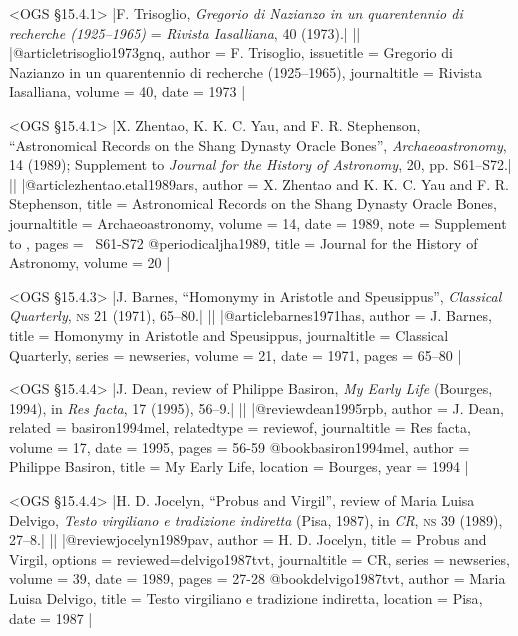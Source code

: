 \documentclass[extrafontsizes,11pt,a4paper,oneside]{memoir}
\begin{document}
\bibexample<OGS \S15.4.1>
|F. Trisoglio, \emph{Gregorio di Nazianzo in un quarentennio di recherche (1925--1965)} = \emph{Rivista Iasalliana}, 40 (1973).|%
||%
|@article{trisoglio1973gnq,
  author = {F. Trisoglio},
  issuetitle = {Gregorio di Nazianzo in un quarentennio di recherche (1925--1965)},
  journaltitle = {Rivista Iasalliana},
  volume = {40},
  date = {1973}
}|

\bibexample<OGS \S15.4.1>
|X. Zhentao, K. K. C. Yau, and F. R. Stephenson, \enquote{Astronomical Records on the Shang Dynasty Oracle Bones}, \emph{Archaeoastronomy}, 14 (1989); Supplement to \emph{Journal for the History of Astronomy}, 20, pp. S61--S72.|%
||%
|@article{zhentao.etal1989ars,
  author = {X. Zhentao and K. K. C. Yau and F. R. Stephenson},
  title = {Astronomical Records on the Shang Dynasty Oracle Bones},
  journaltitle = {Archaeoastronomy},
  volume = {14},
  date = {1989},
  note = {Supplement to },
  pages = {\ppno~S61-S72}
}
@periodical{jha1989,
  title = {Journal for the History of Astronomy},
  volume = {20}
}|

\bibexample<OGS \S15.4.3>
|J. Barnes, \enquote{Homonymy in Aristotle and Speusippus}, \emph{Classical Quarterly}, \textsc{ns} 21 (1971), 65--80.|%
||%
|@article{barnes1971has,
  author = {J. Barnes},
  title = {Homonymy in Aristotle and Speusippus},
  journaltitle = {Classical Quarterly},
  series = {newseries},
  volume = {21},
  date = {1971},
  pages = {65--80}
}|

\bibexample<OGS \S15.4.4>
|J. Dean, review of Philippe Basiron, \emph{My Early Life} (Bourges, 1994), in \emph{Res facta}, 17 (1995), 56--9.|%
||%
|@review{dean1995rpb,
  author = {J. Dean},
  related = {basiron1994mel},
  relatedtype = {reviewof},
  journaltitle = {Res facta},
  volume = {17},
  date = {1995},
  pages = {56-59}
}
@book{basiron1994mel,
  author = {Philippe Basiron},
  title = {My Early Life},
  location = {Bourges},
  year = {1994}
}|

\bibexample<OGS \S15.4.4>
|H. D. Jocelyn, \enquote{Probus and Virgil}, review of Maria Luisa Delvigo, \emph{Testo virgiliano e tradizione indiretta} (Pisa, 1987), in \emph{CR}, \textsc{ns} 39 (1989), 27--8.|%
||%
|@review{jocelyn1989pav,
  author = {H. D. Jocelyn},
  title = {Probus and Virgil},
  options = {reviewed=delvigo1987tvt},
  journaltitle = {CR},
  series = {newseries},
  volume = {39},
  date = {1989},
  pages = {27-28}
}
@book{delvigo1987tvt,
  author = {Maria Luisa Delvigo},
  title = {Testo virgiliano e tradizione indiretta},
  location = {Pisa},
  date = {1987}
}|
\end{document}
